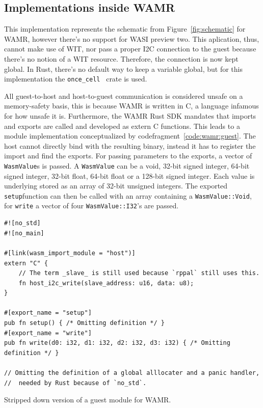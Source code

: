 \subsection{Implementations inside WAMR}

This implementation represents the schematic from Figure~\ref{fig:schematic} for WAMR, however there's no support for \gls{WASI} preview two. This aplication, thus, cannot make use of \gls{WIT}, nor pass a proper I2C connection to the guest because there's no notion of a WIT resource. Therefore, the connection is now kept global. In Rust, there's no default way to keep a variable global, but for this implementation the \texttt{once\_cell}~\cite{gh:once-cell} crate is used. 

All guest-to-host and host-to-guest communication is considered unsafe on a memory-safety basis, this is because WAMR is written in C, a language infamous for how unsafe it is. Furthermore, the WAMR Rust SDK mandates that imports and exports are called and developed as extern C functions. This leads to a module implementation conceptualized by codefragment~\ref{code:wamr:guest}. The host cannot directly bind with the resulting binary, instead it has to register the import and find the exports. 
For passing parameters to the exports, a vector of \texttt{WasmValue}s is passed. A \texttt{WasmValue} can be a void, 32-bit signed integer, 64-bit signed integer, 32-bit float, 64-bit float or a 128-bit signed integer. Each value is underlying stored as an array of 32-bit unsigned integers. The exported \texttt{setup}function can then be called with an array containing a \texttt{WasmValue::Void}, for \texttt{write} a vector of four \texttt{WasmValue::I32}'s are passed.

\begin{listing}[h]
\begin{verbatim}
#![no_std]
#![no_main]

#[link(wasm_import_module = "host")]
extern "C" {
    // The term _slave_ is still used because `rppal` still uses this.
    fn host_i2c_write(slave_address: u16, data: u8);
}

#[export_name = "setup"]
pub fn setup() { /* Omitting definition */ }
#[export_name = "write"]
pub fn write(d0: i32, d1: i32, d2: i32, d3: i32) { /* Omitting definition */ }

// Omitting the definition of a global alllocater and a panic handler,
//  needed by Rust because of `no_std`.
\end{verbatim}
\caption{Stripped down version of a guest module for WAMR.}
\label{code:wamr:guest}
\end{listing}

